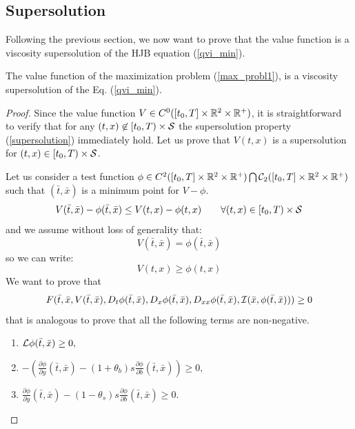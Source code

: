 \subsection{Supersolution}

Following the previous section, we now want to prove that the value function is a viscosity supersolution of the HJB equation (\ref{qvi_min}). 

\begin{Theorem}\label{supersolution_th}
 The value function of the maximization problem (\ref{max_probl1}), is a viscosity supersolution of the Eq. (\ref{qvi_min}).
\end{Theorem}

\begin{proof}
Since the value function $V \in C^0([t_0,T]\times \mathbb{R}^2\times \mathbb{R}^+)$, it is straightforward to verify that for any $(t, x) \not \in [t_0,T) \times \mathcal{S}$
the supersolution property (\ref{supersolution}) immediately hold.
Let us prove that $V(t, x)$ is a supersolution for $(t, x) \in [t_0,T) \times \mathcal{S}$.

Let us consider a test function $ \phi \in C^2([t_0,T] \times \mathbb{R}^2\times \mathbb{R}^+) \bigcap \mathcal{C}_2([t_0,T] \times \mathbb{R}^2\times \mathbb{R}^+)$ such that 
$(\bar t,\bar x)$ is a minimum point for $V-\phi$.\\
\begin{equation}
 V(\bar t,\bar x) - \phi(\bar t,\bar x) \leq V(t,x) - \phi(t, x) \hspace{2em} \forall (t,x) \in [t_0,T) \times \mathcal{S}
\end{equation}
and we assume without loss of generality that:
\begin{equation}\label{min_point}
V(\bar t,\bar x) = \phi(\bar t,\bar x)  
\end{equation}
so we can write:
\begin{equation}\label{min_point2}
V(t,x) \geq \phi(t, x) 
\end{equation}
We want to prove that
$$ F(\bar t,\bar x,V(\bar t, \bar x),D_t \phi(\bar t, \bar x),D_x \phi(\bar t, \bar x),D_{xx}\phi(\bar t, \bar x),
\mathcal{I}(\bar x,\phi(\bar t, \bar x))) \geq 0  $$
that is analogous to prove that all the following terms are non-negative.
\begin{enumerate}
 \item 
 $ \mathcal{L} \phi(\bar t, \bar x) \geq 0 ,$
 \item $-\left(\frac{\partial \phi}{\partial y}(\bar t, \bar x)
 -(1+\theta_b)s \frac{\partial \phi}{\partial b}(\bar t, \bar x)\right) \geq 0,$
 \item $\frac{\partial \phi}{\partial y}(\bar t, \bar x)-(1-\theta_s)s \frac{\partial \phi}{\partial b}(\bar t, \bar x) \geq 0.$
\end{enumerate}


\end{proof}
